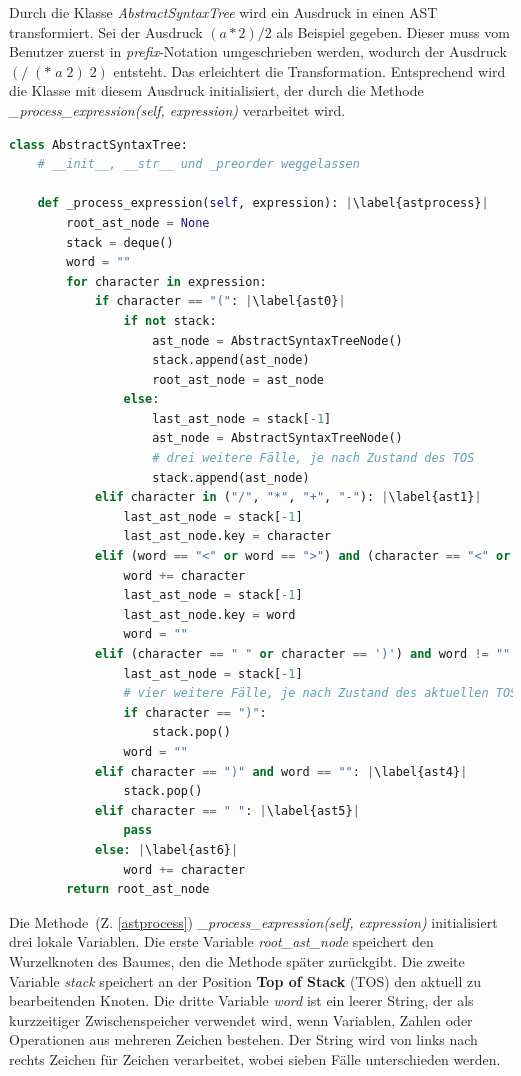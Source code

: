 Durch die Klasse \textit{AbstractSyntaxTree} wird ein Ausdruck in einen AST transformiert. Sei der Ausdruck $(a * 2) / 2$ als Beispiel gegeben.
Dieser muss vom Benutzer zuerst in \textit{prefix}-Notation umgeschrieben werden, wodurch der Ausdruck $(/\; (* \;a \;2) \;2)$ entsteht. Das erleichtert die Transformation.
Entsprechend wird die Klasse mit diesem Ausdruck initialisiert, der durch die Methode \textit{\_process\_expression(self, expression)} verarbeitet wird.

\begin{lstlisting}[language=Python, escapechar=|, caption=Auszug aus der Klasse \textit{AbstractSyntaxTree}, label={lst:ast}]
class AbstractSyntaxTree:
    # __init__, __str__ und _preorder weggelassen 

    def _process_expression(self, expression): |\label{astprocess}|
        root_ast_node = None
        stack = deque()
        word = ""
        for character in expression:
            if character == "(": |\label{ast0}|
                if not stack:
                    ast_node = AbstractSyntaxTreeNode()
                    stack.append(ast_node)
                    root_ast_node = ast_node
                else:
                    last_ast_node = stack[-1]
                    ast_node = AbstractSyntaxTreeNode()
                    # drei weitere Fälle, je nach Zustand des TOS
                    stack.append(ast_node)
            elif character in ("/", "*", "+", "-"): |\label{ast1}|
                last_ast_node = stack[-1]
                last_ast_node.key = character
            elif (word == "<" or word == ">") and (character == "<" or character == ">"): |\label{ast2}|
                word += character
                last_ast_node = stack[-1]
                last_ast_node.key = word
                word = ""
            elif (character == " " or character == ')') and word != "": |\label{ast3}|
                last_ast_node = stack[-1]
                # vier weitere Fälle, je nach Zustand des aktuellen TOS
                if character == ")":
                    stack.pop()
                word = ""
            elif character == ")" and word == "": |\label{ast4}|
                stack.pop()
            elif character == " ": |\label{ast5}|
                pass
            else: |\label{ast6}|
                word += character
        return root_ast_node
\end{lstlisting}

Die Methode~(Z. \ref{astprocess}) \textit{\_process\_expression(self, expression)} initialisiert drei lokale Variablen.
Die erste Variable \textit{root\_ast\_node} speichert den Wurzelknoten des Baumes, den die Methode später zurückgibt.
Die zweite Variable \textit{stack} speichert an der 
Position \textbf{Top of Stack} (TOS) den aktuell zu bearbeitenden Knoten. Die dritte Variable \textit{word} ist ein leerer String, der als kurzzeitiger Zwischenspeicher verwendet wird,
wenn Variablen, Zahlen oder Operationen aus mehreren Zeichen bestehen.
Der String wird von links nach rechts Zeichen für Zeichen verarbeitet, wobei sieben Fälle unterschieden werden.

